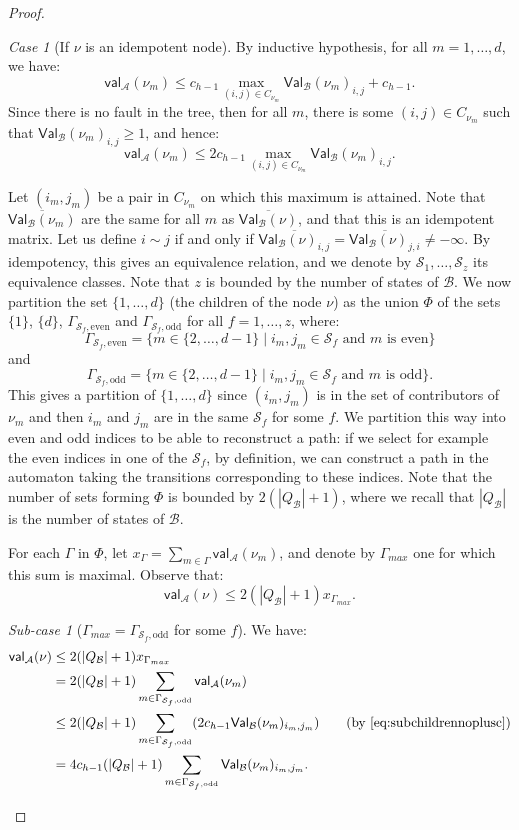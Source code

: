 \documentclass{lmcs}
\theoremstyle{remark}
\newtheorem{case}{Case}
\newtheorem{subcase}{Sub-case}[case]
\newcommand{\autA}{\mathcal{A}}
\newcommand{\autB}{\mathcal{B}}
\newcommand{\aval}{\mathsf{val}_\autA}
\newcommand{\bval}{\mathsf{Val}_\autB}
\theoremstyle{remark}
\begin{document}
\begin{proof}
\begin{case}[If $\nu$ is an idempotent node]
By inductive hypothesis, for all $m=1,\ldots, d$, we have:
\[ \aval(\nu_m) \leq c_{h-1} \max_{(i,j) \in C_{\nu_m}} \bval(\nu_m)_{i,j} + c_{h-1}.\]
Since there is no fault in the tree, then for all $m$, there is some $(i,j) \in C_{\nu_m}$ such that  $\bval(\nu_m)_{i,j} \geq 1$, and hence:
\begin{equation}\label{eq:subchildrennoplusc} \aval(\nu_m) \leq 2c_{h-1} \max_{(i,j) \in C_{\nu_m}} \bval(\nu_m)_{i,j}.\end{equation}

Let $(i_m,j_m)$ be a pair in $C_{\nu_m}$ on which this maximum is attained. Note that $\overline{\bval(\nu_m)}$ are the same for all $m$ as $\overline{\bval(\nu)}$, and that this is an idempotent matrix. Let us define $i\sim j$ if and only if $\overline{\bval(\nu)_{i,j}} = \overline{\bval(\nu)_{j,i}} \neq -\infty$. By idempotency, this gives an equivalence relation, and we denote by $\mathcal{S}_1,\dots,\mathcal{S}_{z}$ its equivalence classes. Note that $z$ is bounded by the number of states of $\autB$.
We now partition the set $\{1,\ldots, d\}$ (the children of the node $\nu$) as the union $\Phi$ of the sets $\{1\}$, $\{d\}$, $\Gamma_{\mathcal{S}_f,\text{even}}$ and $\Gamma_{\mathcal{S}_f,\text{odd}}$ for all $f=1,\ldots,z$, where:
\[\Gamma_{\mathcal{S}_f,\text{even}} =  \{ m \in\{2,\dots, d-1\} \mid i_m,j_m\in \mathcal{S}_f \text{ and $m$ is even}\}\]
and
\[\Gamma_{\mathcal{S}_f,\text{odd}} =  \{ m \in\{2,\dots, d-1\} \mid i_m,j_m\in \mathcal{S}_f \text{ and $m$ is odd}\}.\]
This gives a partition of $\{1,\ldots, d\}$ since $(i_m,j_m)$ is in the set of contributors of $\nu_m$ and then $i_m$ and $j_m$ are in the same $\mathcal{S}_f$ for some $f$. We partition this way into even and odd indices to be able to reconstruct a path: if we select for example the even indices in one of the $\mathcal{S}_f$, by definition, we can construct a path in the automaton taking the transitions corresponding to these indices.
Note that the number of sets forming $\Phi$ is bounded by $2(|Q_\autB| + 1)$, where we recall that $|Q_\autB|$ is the number of states of $\autB$.

For each $\Gamma$ in $\Phi$, let $x_\Gamma = \sum_{m\in \Gamma} \aval(\nu_m)$, and denote by $\Gamma_{max}$ one for which this sum is maximal. Observe that:
\[\aval(\nu) \leq 2(|Q_\autB| + 1)x_{\Gamma_{max}}.\]

\begin{subcase}[$\Gamma_{max} = \Gamma_{\mathcal{S}_f,\text{odd}}$ for some $f$]
We have:
\begin{align*}
\aval(\nu) &\le 2(|Q_\autB| + 1)x_{\Gamma_{max}}
\\&= 2(|Q_\autB| + 1)\sum_{m\in \Gamma_{\mathcal{S}_f,\text{odd}}}\aval(\nu_m) 
\\&\le 2(|Q_\autB| + 1)\sum_{m\in \Gamma_{\mathcal{S}_f,\text{odd}}}(2c_{h-1} \bval(\nu_m)_{i_m,j_m})
\tag{by~\cref{eq:subchildrennoplusc}}
\\&= 4c_{h-1}(|Q_\autB| + 1)\sum_{m\in \Gamma_{\mathcal{S}_f,\text{odd}}}\bval(\nu_m)_{i_m,j_m}.
\end{align*}


\end{subcase}
\end{case}
\end{proof}
\end{document}
